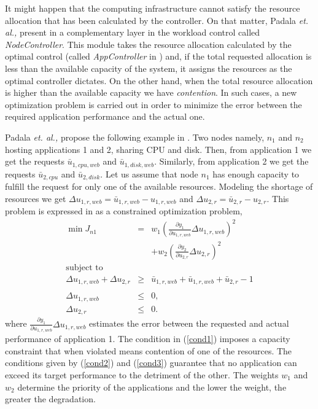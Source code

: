 It might happen that the computing infrastructure cannot satisfy the resource allocation that has been calculated by the controller.
On that matter, Padala \emph{et. al.,} present in \cite{Padala-2009} a complementary layer in the workload control called \emph{NodeController}. This module takes the resource 
allocation calculated by the optimal control (called \emph{AppController} in \cite{Padala-2009}) and, if the total requested allocation is less than the available 
capacity of the system, it assigns the resources as the optimal controller dictates. On the other hand, 
when the total resource allocation is higher than the available capacity we have  \emph{contention}. In such cases,
a new optimization problem is carried out in order to minimize the error between the required application performance and the 
actual one.

Padala \emph{et. al.,} propose the following example in \cite{Padala-2009}. Two nodes namely, $n_{1}$ and $n_{2}$ hosting applications 1 and 2, sharing 
CPU and disk. Then, from application 1 we get the requests 
$\bar{u}_{1,cpu,web}$ and $\bar{u}_{1,disk,web}$.
Similarly, from application 2 we get the requests $\bar{u}_{2,cpu}$ and $\bar{u}_{2,disk}$.
Let us assume that node $n_{1}$ has enough capacity to fulfill the request for only one of the available resources. 
Modeling the shortage of resources we get $\Delta u_{1,r,web} = \bar{u}_{1,r,web}-u_{1,r,web}$ and 
$\Delta u_{2,r} = \bar{u}_{2,r}-u_{2,r}$. This problem is expressed in \cite{Padala-2009} as a constrained optimization problem,
\begin{eqnarray}
 \min J_{n1} & = & w_{1}\left(\frac{\partial y_{1}}{\partial u_{1,r,web}}\Delta u_{1,r,web} \right)^{2} \nonumber \\
 &&+
w_{2}\left(\frac{\partial y_{2}}{\partial u_{2,r}}\Delta u_{2,r} \right)^{2} \label{costn1} \\
\mbox{subject to} & & \nonumber \\
 \Delta u_{1,r,web} + \Delta u_{2,r} & \geq & \bar{u}_{1,r,web} + \bar{u}_{1,r,web} + \bar{u}_{2,r}-1 \nonumber \\
 \label{cond1} \\
\Delta u_{1,r,web} & \leq & 0, \label{cond2} \\
\Delta u_{2,r} & \leq & 0. \label{cond3}
\end{eqnarray}
where $\frac{\partial y_{1}}{\partial u_{1,r,web}}\Delta u_{1,r,web}$ estimates the error between the
requested and actual performance of application 1.
The condition in (\ref{cond1}) imposes a capacity constraint
that when violated means contention of one of the resources. The conditions given by (\ref{cond2}) and (\ref{cond3})
guarantee that no application can exceed its target performance to the detriment of the other.  
The weights $w_{1}$ and $w_{2}$ determine the priority of the applications and the lower the weight, the greater the degradation.


